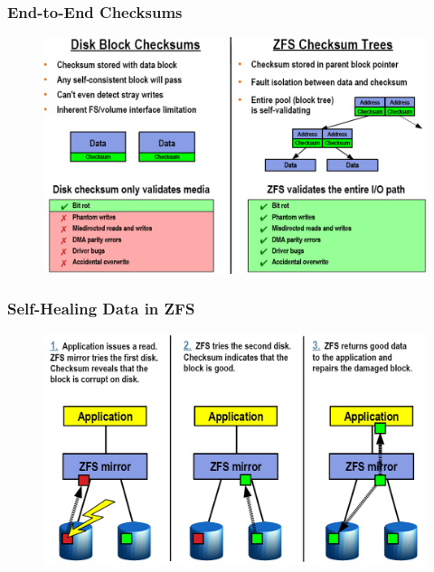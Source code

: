 % 
% 
% 
% 
% 
% 
% 
\begin{frame}[fragile]
    \frametitle{End-to-End Checksums}
    \begin{figure}
    \includegraphics[width=0.8\linewidth]{figs/ZFS-checksum.png}
    \end{figure}
\end{frame}
% 
% 
\begin{frame}[fragile]
    \frametitle{Self-Healing Data in ZFS}
    \begin{figure}
    \includegraphics[width=0.8\linewidth]{figs/ZFS-self-healing.png}
    \end{figure}
\end{frame}

